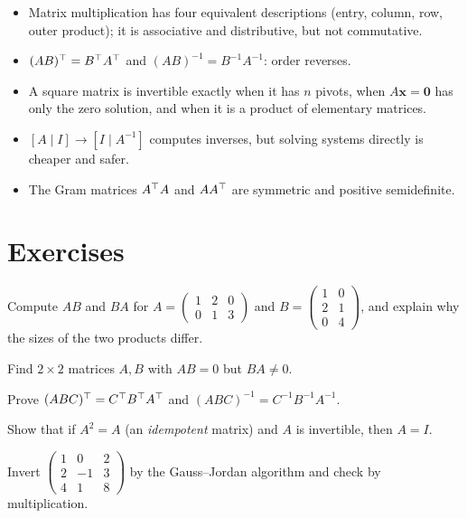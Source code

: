 \begin{summarybox}
\begin{itemize}
  \item Matrix multiplication has four equivalent descriptions (entry, column, row, outer product); it is associative and distributive, but not commutative.
  \item $(AB)^{\top}=B^{\top} A^{\top}$ and $(AB)^{-1}=B^{-1}A^{-1}$: order reverses.
  \item A square matrix is invertible exactly when it has $n$ pivots, when $A\mathbf{x}=\mathbf{0}$ has only the zero solution, and when it is a product of elementary matrices.
  \item $[A\mid I]\to[I\mid A^{-1}]$ computes inverses, but solving systems directly is cheaper and safer.
  \item The Gram matrices $A^{\top} A$ and $AA^{\top}$ are symmetric and positive semidefinite.
\end{itemize}
\end{summarybox}

\section{Exercises}

\begin{exercise}
Compute $AB$ and $BA$ for $A=\begin{pmatrix}1&2&0\\0&1&3\end{pmatrix}$ and $B=\begin{pmatrix}1&0\\2&1\\0&4\end{pmatrix}$, and explain why the sizes of the two products differ.
\end{exercise}

\begin{exercise}
Find $2\times 2$ matrices $A,B$ with $AB=0$ but $BA\ne0$.
\end{exercise}

\begin{exercise}
Prove $(ABC)^{\top}=C^{\top} B^{\top} A^{\top}$ and $(ABC)^{-1}=C^{-1}B^{-1}A^{-1}$.
\end{exercise}

\begin{exercise}
Show that if $A^2=A$ (an \emph{idempotent} matrix) and $A$ is invertible, then $A=I$.
\end{exercise}

\begin{exercise}
Invert $\begin{pmatrix}1&0&2\\2&-1&3\\4&1&8\end{pmatrix}$ by the Gauss--Jordan algorithm and check by multiplication.
\end{exercise}

